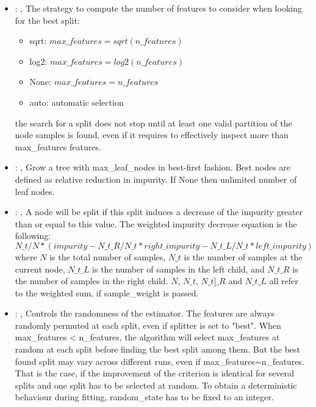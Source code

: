 \begin{itemize}
    \item {}: , 
      The strategy to compute the number of features to consider when looking for the best split:
      \begin{itemize}                                                     \item sqrt:
      $max\_features=sqrt(n\_features)$                                                     \item
      log2: $max\_features=log2(n\_features)$
      \item None: $max\_features=n\_features$
      \item auto: automatic selection
      \end{itemize}                                                   \nb the search for a split
      does not stop until at least one valid partition of the node
      samples is found, even if it requires to effectively inspect more than max\_features features.

    \item {}: , 
      Grow a tree with max\_leaf\_nodes in best-first fashion. Best nodes are defined as relative
      reduction                                                  in impurity. If None then unlimited
      number of leaf nodes.

    \item {}: , 
      A node will be split if this split induces a decrease of the impurity greater than or equal to
      this value.                                                  The weighted impurity decrease
      equation is the following:                                                  $N\_t / N *
      (impurity - N\_t\_R / N\_t * right\_impurity - N\_t\_L / N\_t * left\_impurity)$
      where $N$ is the total number of samples, $N\_t$ is the number of samples at the current node,
      $N\_t\_L$ is the number                                                  of samples in the
      left child, and $N\_t\_R$ is the number of samples in the right child.
      $N$, $N\_t$, $N\_t]\_R$ and $N\_t\_L$ all refer to the weighted sum, if sample\_weight is
      passed.

    \item {}: , 
      Controls the randomness of the estimator. The features are
      always randomly permuted at each split, even if splitter is set to
      "best". When max\_features < n\_features, the algorithm will select
      max\_features at random at each split before finding the best split
      among them. But the best found split may vary across different runs,
      even if max\_features=n\_features. That is the case, if the improvement
      of the criterion is identical for several splits and one split has to
      be selected at random. To obtain a deterministic behaviour during
      fitting, random\_state has to be fixed to an integer.
  \end{itemize}


